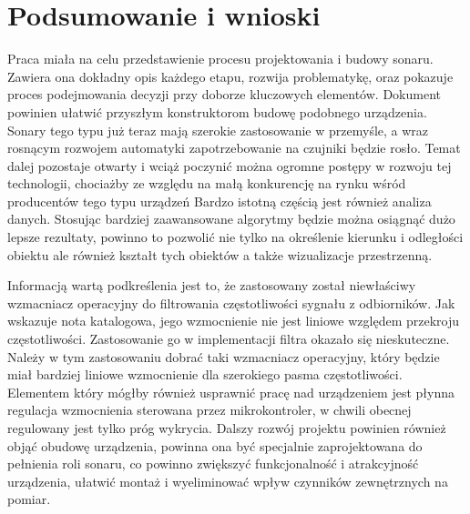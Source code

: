 \chapter[Podsumowanie i wnioski]{Podsumowanie i wnioski}

\label{chapter:wnioski}

Praca miała na celu przedstawienie procesu projektowania i budowy sonaru. Zawiera ona dokładny opis każdego etapu, rozwija problematykę, 
oraz pokazuje proces podejmowania decyzji przy doborze kluczowych elementów. Dokument powinien ułatwić przyszłym konstruktorom budowę podobnego urządzenia.
Sonary tego typu już teraz mają szerokie zastosowanie w przemyśle, a wraz rosnącym rozwojem automatyki zapotrzebowanie na czujniki będzie rosło. 
Temat dalej pozostaje otwarty i wciąż poczynić można ogromne postępy w rozwoju tej technologii, chociażby ze względu na małą konkurencję na rynku wśród producentów tego typu urządzeń
Bardzo istotną częścią jest również analiza danych. Stosując bardziej zaawansowane algorytmy będzie można osiągnąć dużo lepsze rezultaty, 
powinno to pozwolić nie tylko na określenie kierunku i odległości obiektu ale również kształt tych obiektów a także wizualizacje przestrzenną.

Informacją wartą podkreślenia jest to, że zastosowany został niewłaściwy wzmacniacz operacyjny do filtrowania częstotliwości sygnału z odbiorników. Jak wskazuje nota katalogowa, 
jego wzmocnienie nie jest liniowe względem przekroju częstotliwości. Zastosowanie go w implementacji filtra okazało się nieskuteczne. Należy w tym zastosowaniu dobrać taki wzmacniacz operacyjny, 
który będzie miał bardziej liniowe wzmocnienie dla szerokiego pasma częstotliwości. 
Elementem który mógłby również usprawnić pracę nad urządzeniem jest płynna regulacja wzmocnienia sterowana przez mikrokontroler, 
w chwili obecnej regulowany jest tylko próg wykrycia.
Dalszy rozwój projektu powinien również objąć obudowę urządzenia, powinna ona być specjalnie zaprojektowana do pełnienia roli sonaru, 
co powinno zwiększyć funkcjonalność i atrakcyjność urządzenia, ułatwić montaż i wyeliminować wpływ czynników zewnętrznych na pomiar. 
